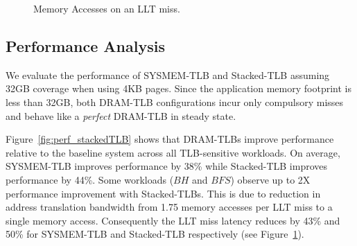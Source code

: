 \begin{figure}[tp] 
  \vspace{0.in} \centering
  \centerline{}

  \caption{\small Memory Accesses on an LLT miss.\normalsize}
  \label{fig:tlblat_stackedTLB} 
  \vspace{-0.1 in}
\end{figure}

\subsection{Performance Analysis}



\noindent We evaluate the performance of SYSMEM-TLB and Stacked-TLB
assuming 32GB coverage when using 4KB pages. Since the application
memory footprint is less than 32GB, both DRAM-TLB configurations incur
only compulsory misses and behave like a {\em perfect} DRAM-TLB in
steady state.


Figure~\ref{fig:perf_stackedTLB} shows that DRAM-TLBs improve
performance relative to the baseline system across all TLB-sensitive
workloads. On average, SYSMEM-TLB improves performance by 38\% while
Stacked-TLB improves performance by 44\%. Some workloads ($BH$ and
$BFS$) observe up to 2X performance improvement with Stacked-TLBs.
This is due to reduction in address translation bandwidth from 1.75
memory accesses per LLT miss to a single memory access. Consequently
the LLT miss latency reduces by 43\% and 50\% for SYSMEM-TLB and
Stacked-TLB respectively (see Figure~\ref{fig:tlblat_stackedTLB}).

